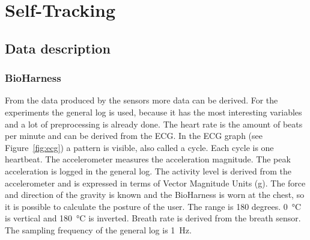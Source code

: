\section{Self-Tracking}
	\subsection{Data description}
	\label{sec:datadescription}
		\subsubsection{BioHarness}
		From the data produced by the sensors more data can be derived. For the experiments the general log is used, because it has the most interesting variables and a lot of preprocessing is already done. The heart rate is the amount of beats per minute and can be derived from the ECG. In the ECG graph (see Figure~\ref{fig:ecg}) a pattern is visible, also called a cycle. Each cycle is one heartbeat. 
			The accelerometer measures the acceleration magnitude. The peak acceleration is logged in the general log.
			The activity level is derived from the accelerometer and is expressed in terms of Vector Magnitude Units (g).
			The force and direction of the gravity is known and the BioHarness is worn at the chest, so it is possible to calculate the posture of the user. The range is 180 degrees. \SI{0}{\celsius} is vertical and \SI{180}{\celsius} is inverted.
			Breath rate is derived from the breath sensor. The sampling frequency of the general log is \SI{1}{\hertz}.
